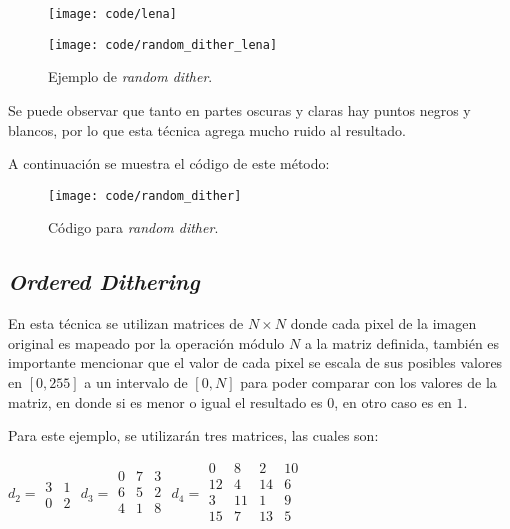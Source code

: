 \documentclass[conference]{IEEEtran}
\begin{document}
\begin{figure}[htbp]
\centerline{\texttt{[image: code/lena]}}
\centerline{\texttt{[image: code/random\_dither\_lena]}}
\caption{Ejemplo de \textit{random dither}.}
\label{random}
\end{figure}

Se puede observar que tanto en partes oscuras y claras hay puntos negros y blancos, por lo que esta técnica agrega mucho ruido al resultado.

A continuación se muestra el código de este método:

\begin{figure}[htbp]
\centerline{\texttt{[image: code/random\_dither]}}
\caption{Código para \textit{random dither}.}
\label{randomPy}
\end{figure}


\subsection{\textit{Ordered Dithering}}

En esta técnica se utilizan matrices de $N\times N$ donde cada pixel de la imagen original es mapeado por la operación módulo $N$ a la matriz definida, también es importante mencionar que el valor de cada pixel se escala de sus posibles valores en $[0,255]$ a un intervalo de $[0,N]$ para poder comparar con los valores de la matriz, en donde si es menor o igual el resultado es $0$, en otro caso es en $1$.

Para este ejemplo, se utilizarán tres matrices, las cuales son\cite{b3}:

$d_2=\begin{matrix}
	3 & 1\\
	0 & 2
\end{matrix}$
$d_3=\begin{matrix}
	0 & 7 & 3\\
	6 & 5 & 2\\
	4 & 1 & 8\\
\end{matrix}$
$d_4=\begin{matrix}
	0 & 8 & 2 & 10\\
	12 & 4 & 14 & 6\\
	3 & 11 & 1 & 9\\
	15 & 7 & 13 & 5\\
\end{matrix}$
\end{document}
